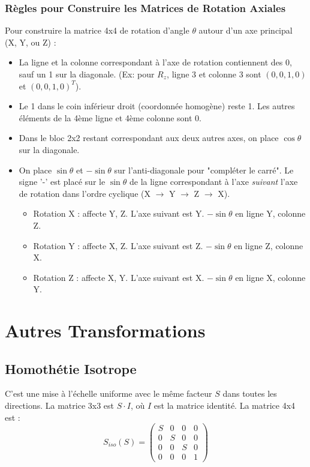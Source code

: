 \documentclass{article}
\begin{document}
\subsubsection{Règles pour Construire les Matrices de Rotation Axiales}
Pour construire la matrice 4x4 de rotation d'angle $\theta$ autour d'un axe principal (X, Y, ou Z) :
\begin{itemize}
    \item La ligne et la colonne correspondant à l'axe de rotation contiennent des 0, sauf un 1 sur la diagonale. (Ex: pour $R_z$, ligne 3 et colonne 3 sont $(0, 0, 1, 0)$ et $(0, 0, 1, 0)^T$).
    \item Le 1 dans le coin inférieur droit (coordonnée homogène) reste 1. Les autres éléments de la 4ème ligne et 4ème colonne sont 0.
    \item Dans le bloc 2x2 restant correspondant aux deux autres axes, on place $\cos\theta$ sur la diagonale.
    \item On place $\sin\theta$ et $-\sin\theta$ sur l'anti-diagonale pour "compléter le carré". Le signe '-' est placé sur le $\sin\theta$ de la ligne correspondant à l'axe \textit{suivant} l'axe de rotation dans l'ordre cyclique (X $\to$ Y $\to$ Z $\to$ X).
        \begin{itemize}
            \item Rotation X : affecte Y, Z. L'axe suivant est Y. $-\sin\theta$ en ligne Y, colonne Z.
            \item Rotation Y : affecte X, Z. L'axe suivant est Z. $-\sin\theta$ en ligne Z, colonne X.
            \item Rotation Z : affecte X, Y. L'axe suivant est X. $-\sin\theta$ en ligne X, colonne Y.
        \end{itemize}
\end{itemize}

\section{Autres Transformations}

\subsection{Homothétie Isotrope}
C'est une mise à l'échelle uniforme avec le même facteur $S$ dans toutes les directions. La matrice 3x3 est $S \cdot I$, où $I$ est la matrice identité. La matrice 4x4 est :
\[ S_{iso}(S) = \begin{pmatrix} S & 0 & 0 & 0 \\ 0 & S & 0 & 0 \\ 0 & 0 & S & 0 \\ 0 & 0 & 0 & 1 \end{pmatrix} \]
\end{document}
